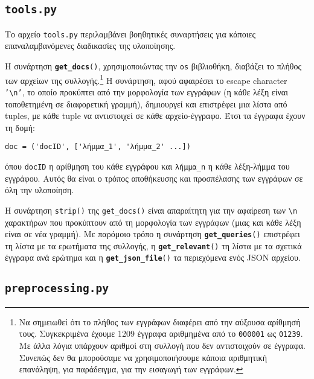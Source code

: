﻿\documentclass[12pt]{report}
\begin{document}
    \subsection{\tt tools.py}

    Το αρχείο \texttt{tools.py} περιλαμβάνει βοηθητικές συναρτήσεις για κάποιες επαναλαμβανόμενες διαδικασίες της υλοποίησης.

    Η συνάρτηση \texttt{\textbf{get\_docs}()}, χρησιμοποιώντας την \texttt{os} βιβλιοθήκη, διαβάζει το πλήθος των αρχείων της συλλογής.\footnote{Να σημειωθεί ότι το πλήθος των εγγράφων διαφέρει από την αύξουσα αρίθμησή τους. Συγκεκριμένα έχουμε 1209 έγγραφα αριθμημένα από το \texttt{000001} ως \texttt{01239}. Με άλλα λόγια υπάρχουν αριθμοί στη συλλογή που δεν αντιστοιχούν σε έγγραφα. Συνεπώς δεν θα μπορούσαμε να χρησιμοποιήσουμε κάποια αριθμητική επανάληψη, για παράδειγμα, για την εισαγωγή των εγγράφων.}
    Η συνάρτηση, αφού αφαιρέσει το escape character \texttt{'\textbackslash n'}, το οποίο προκύπτει από την μορφολογία των εγγράφων (η κάθε λέξη είναι τοποθετημένη σε διαφορετική γραμμή),
    δημιουργεί \linebreak και επιστρέφει μια λίστα από tuples, με κάθε tuple να αντιστοιχεί σε κάθε αρχείο-έγγραφο. \linebreak
    Έτσι τα έγγραφα έχουν τη δομή:
    \begin{graycomment}
        \centering
        \verb|doc = ('docID', ['λήμμα_1', 'λήμμα_2' ...])|
    \end{graycomment}

    \noindent όπου \texttt{docID} η αρίθμηση του κάθε εγγράφου και \verb|λήμμα_n| η κάθε λέξη-λήμμα του εγγράφου.
    Αυτός θα είναι ο τρόπος αποθήκευσης και προσπέλασης των εγγράφων σε όλη την υλοποίηση.

    Η συνάρτηση \texttt{strip()} της \verb|get_docs()| είναι απαραίτητη για την αφαίρεση των \texttt{\textbackslash n} χαρακτήρων
    που προκύπτουν από τη μορφολογία των εγγράφων (μιας και κάθε λέξη είναι σε νέα γραμμή).
    Με παρόμοιο τρόπο η συνάρτηση \texttt{\textbf{get\_queries}()} επιστρέφει τη λίστα με τα ερωτήματα της συλλογής,
    η \texttt{\textbf{get\_relevant}()} τη λίστα με τα σχετικά έγγραφα ανά ερώτημα και η \texttt{\textbf{get\_json\_file}()} τα περιεχόμενα ενός JSON αρχείου.

    \subsection{\tt preprocessing.py}
\end{document}
